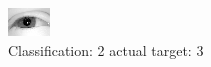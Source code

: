 \begin{figure}[h!]
\begin{center}
\includegraphics[width=0.60\columnwidth]{figures/ID2392_class_2_target_3.png}
\end{center}
\caption{ Classification: 2 actual target: 3}
\label{fig:ID2392_class_2_target_3}
\end{figure}
